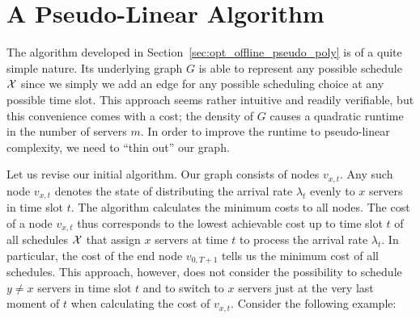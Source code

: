 \section{A Pseudo-Linear Algorithm}\label{sec:opt_offline_pseudo_lin}
The algorithm developed in Section~\ref{sec:opt_offline_pseudo_poly} is of a quite simple nature. Its underlying graph $G$ is able to represent any possible schedule $\mathcal{X}$ since we simply we add an edge for any possible scheduling choice at any possible time slot. This approach seems rather intuitive and readily verifiable, but this convenience comes with a cost; the density of $G$ causes a quadratic runtime in the number of servers $m$. In order to improve the runtime to pseudo-linear complexity, we need to ``thin out'' our graph. 

Let us revise our initial algorithm. Our graph consists of nodes $v_{x,t}$. Any such node $v_{x,t}$ denotes the state of distributing the arrival rate $\lambda_{t}$ evenly to $x$ servers in time slot $t$. The algorithm calculates the minimum costs to all nodes. The cost of a node $v_{x,t}$ thus corresponds to the lowest achievable cost up to time slot $t$ of all schedules $\mathcal{X}$ that assign $x$ servers at time $t$ to process the arrival rate $\lambda_t$. In particular, the cost of the end node $v_{0,T+1}$ tells us the minimum cost of all schedules. This approach, however, does not consider the possibility to schedule $y\neq x$ servers in time slot $t$ and to switch to $x$ servers just at the very last moment of $t$ when calculating the cost of $v_{x,t}$. Consider the following example:
